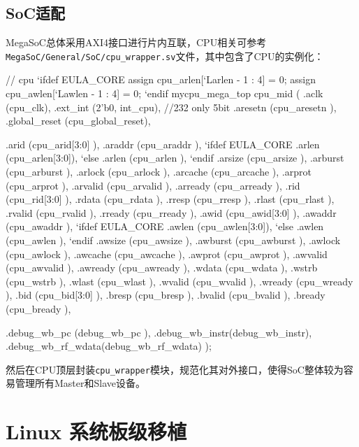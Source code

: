 \subsection{SoC适配}\label{sec:07-soc-and-system-003}

MegaSoC总体采用AXI4接口进行片内互联，CPU相关可参考\texttt{MegaSoC/General/SoC/cpu\_wrapper.sv}文件，其中包含了CPU的实例化：

\begin{CodeBlock}[language=BookVerilog]
// cpu
`ifdef EULA_CORE
  assign cpu_arlen[`Larlen - 1 : 4] = 0;
  assign cpu_awlen[`Lawlen - 1 : 4] = 0;
`endif
mycpu_mega_top cpu_mid (
  .aclk         (cpu_clk),
  .ext_int      ({2'b0, int_cpu}),  //232 only 5bit
  .aresetn      (cpu_aresetn    ),
  .global_reset (cpu_global_reset),
 
  .arid         (cpu_arid[3:0] ),
  .araddr       (cpu_araddr    ),
`ifdef EULA_CORE
  .arlen        (cpu_arlen[3:0]),
`else
  .arlen        (cpu_arlen     ),
`endif
  .arsize       (cpu_arsize    ),
  .arburst      (cpu_arburst   ),
  .arlock       (cpu_arlock    ),
  .arcache      (cpu_arcache   ),
  .arprot       (cpu_arprot    ),
  .arvalid      (cpu_arvalid   ),
  .arready      (cpu_arready   ),
  .rid          (cpu_rid[3:0]  ),
  .rdata        (cpu_rdata     ),
  .rresp        (cpu_rresp     ),
  .rlast        (cpu_rlast     ),
  .rvalid       (cpu_rvalid    ),
  .rready       (cpu_rready    ),
  .awid         (cpu_awid[3:0] ),
  .awaddr       (cpu_awaddr    ),
`ifdef EULA_CORE
  .awlen        (cpu_awlen[3:0]),
`else
  .awlen        (cpu_awlen     ),
`endif
  .awsize       (cpu_awsize    ),
  .awburst      (cpu_awburst   ),
  .awlock       (cpu_awlock    ),
  .awcache      (cpu_awcache   ),
  .awprot       (cpu_awprot    ),
  .awvalid      (cpu_awvalid   ),
  .awready      (cpu_awready   ),
  .wdata        (cpu_wdata     ),
  .wstrb        (cpu_wstrb     ),
  .wlast        (cpu_wlast     ),
  .wvalid       (cpu_wvalid    ),
  .wready       (cpu_wready    ),
  .bid          (cpu_bid[3:0]  ),
  .bresp        (cpu_bresp     ),
  .bvalid       (cpu_bvalid    ),
  .bready       (cpu_bready    ),

  .debug_wb_pc  (debug_wb_pc   ),
  .debug_wb_instr(debug_wb_instr),
  .debug_wb_rf_wdata(debug_wb_rf_wdata)
);
\end{CodeBlock}

然后在CPU顶层封装\texttt{cpu\_wrapper}模块，规范化其对外接口，使得SoC整体较为容易管理所有Master和Slave设备。

\section{Linux 系统板级移植}\label{sec:07-soc-and-system-004}

